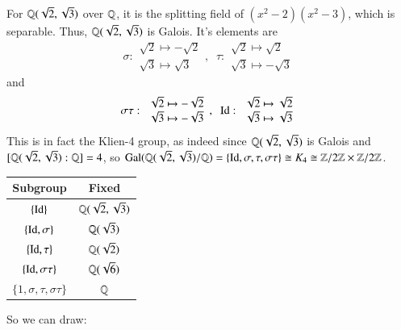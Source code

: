 \documentclass[12pt, a4paper, oneside, openright, titlepage]{book}
\begin{document}
\begin{eg}
    For $\mathbb Q(\sqrt{2},\sqrt{3})$ over $\mathbb Q$, it is the splitting field of $(x^2-2)(x^2-3)$, which is separable. Thus, $\mathbb Q(\sqrt{2},\sqrt{3})$ is Galois. It's elements are \begin{equation*}
        \sigma: \begin{array}{c} \sqrt{2}\mapsto -\sqrt{2} \\ \sqrt{3}\mapsto \sqrt{3}\end{array},\;\;\tau: \begin{array}{c} \sqrt{2}\mapsto \sqrt{2} \\ \sqrt{3}\mapsto -\sqrt{3}\end{array}
    \end{equation*}
    and \begin{equation*}
        \sigma\tau: \begin{array}{c} \sqrt{2}\mapsto -\sqrt{2} \\ \sqrt{3}\mapsto -\sqrt{3}\end{array},\;\;\operatorname{Id}: \begin{array}{c} \sqrt{2}\mapsto \sqrt{2} \\ \sqrt{3}\mapsto \sqrt{3}\end{array}
    \end{equation*}
    This is in fact the Klien-4 group, as indeed since $\mathbb Q(\sqrt{2},\sqrt{3})$ is Galois and $[\mathbb Q(\sqrt{2},\sqrt{3}):\mathbb Q] = 4$, so $\text{Gal}(\mathbb Q(\sqrt{2},\sqrt{3})/\mathbb Q) = \{\operatorname{Id}, \sigma, \tau, \sigma\tau\} \cong K_4 \cong \mathbb Z/2\mathbb Z\times\mathbb Z/2\mathbb Z$. 
    \begin{table}[H]
        \centering
        \begin{tabular}{c|c}
            Subgroup & Fixed \\ \hline
            $\{\operatorname{Id}\}$ & $\mathbb Q(\sqrt{2},\sqrt{3})$ \\ 
            $\{\operatorname{Id},\sigma\}$ & $\mathbb Q(\sqrt{3})$ \\ 
            $\{\operatorname{Id},\tau\}$ & $\mathbb Q(\sqrt{2})$ \\
            $\{\operatorname{Id},\sigma\tau\}$ & $\mathbb Q(\sqrt{6})$ \\
            $\{1,\sigma,\tau,\sigma\tau\}$ & $\mathbb Q$ \\
        \end{tabular}
    \end{table}
    So we can draw:
    \begin{center}
\end{center}
\end{eg}
\end{document}
